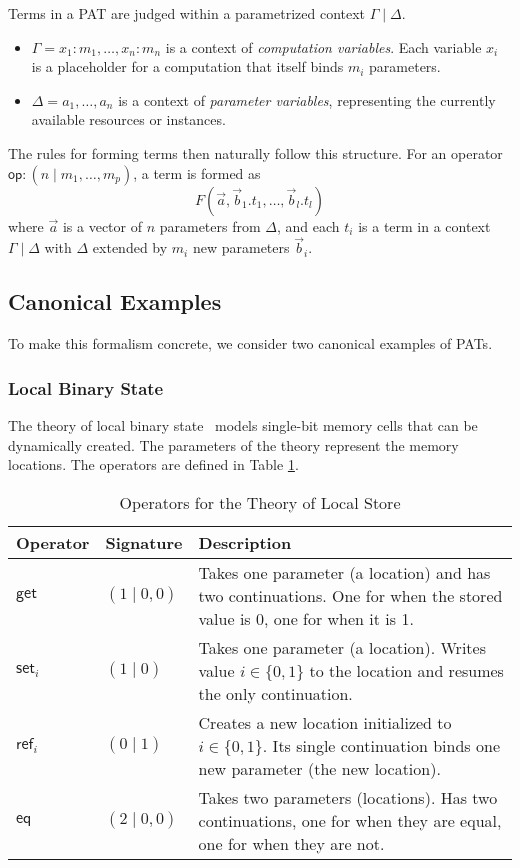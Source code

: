 \documentclass{article}
\theoremstyle{definition}
\theoremstyle{remark}
\newcommand\op{\mathsf{op}}
\newcommand\get{\mathsf{get}}
\newcommand\set{\mathsf{set}}
\newcommand\newref{\mathsf{ref}}
\newcommand\eq{\mathsf{eq}}
\begin{document}
Terms in a PAT are judged within a parametrized context $\Gamma\mid\Delta$.
\begin{itemize}
    \item $\Gamma = x_1:m_1, \dots, x_n:m_n$ is a context of \emph{computation variables}. Each variable $x_i$ is a placeholder for a computation that itself binds $m_i$ parameters.
    \item $\Delta = a_1, \dots, a_n$ is a context of \emph{parameter variables}, representing the currently available resources or instances.
\end{itemize}
The rules for forming terms then naturally follow this structure. For an operator $\op: (n\mid m_1,\dots,m_p)$, a term is formed as
\begin{displaymath}
  F(\vec{a}, \vec{b}_1.t_1, \dots, \vec{b}_l.t_l)
\end{displaymath}
where $\vec{a}$ is a vector of $n$ parameters from $\Delta$, and each $t_i$ is a term in a context $\Gamma\mid\Delta$ with $\Delta$ extended by $m_i$ new parameters $\vec{b}_i$.

\subsection{Canonical Examples} \label{sec:examples}

To make this formalism concrete, we consider two canonical examples of PATs.

\subsubsection{Local Binary State}

The theory of local binary state~\cite{staton_instances_2013} models single-bit memory cells that can be dynamically created.
The parameters of the theory represent the memory locations. The operators are defined in Table \ref{tab:localstore}.

\begin{table}[h]
  \centering
  \begin{tabular}{l l p{8cm}}
    \hline
    \textbf{Operator} & \textbf{Signature} & \textbf{Description} \\
    \hline
    $\get$      & $(1\mid 0,0)$ & Takes one parameter (a location) and has two continuations. One for when the stored value is 0, one for when it is 1. \\
    $\set_i$    & $(1\mid 0)$   & Takes one parameter (a location). Writes value $i \in \{0,1\}$ to the location and resumes the only continuation. \\
    $\newref_i$ & $(0\mid 1)$   & Creates a new location initialized to $i \in \{0,1\}$. Its single continuation binds one new parameter (the new location). \\
    $\eq$       & $(2\mid 0,0)$ & Takes two parameters (locations). Has two continuations, one for when they are equal, one for when they are not. \\
    \hline
  \end{tabular}
  \caption{Operators for the Theory of Local Store}
  \label{tab:localstore}
\end{table}
\end{document}
